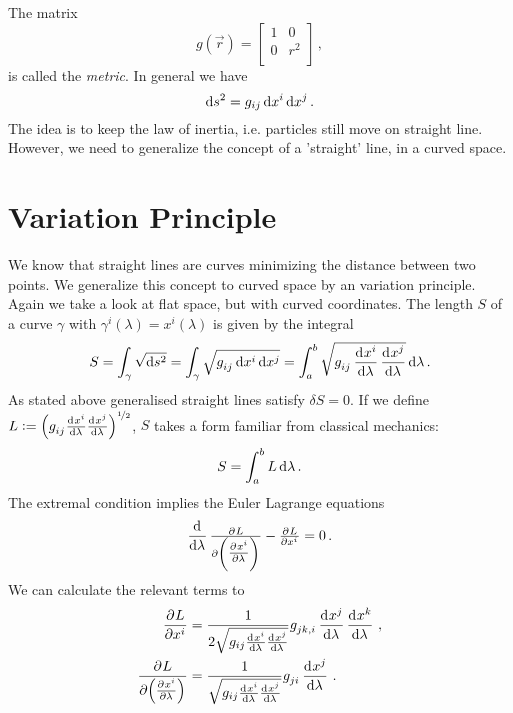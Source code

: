 The matrix
\begin{equation}
    g(\vec{r})=
    \begin{bmatrix}
        1& 0\\
        0& r^2\\
    \end{bmatrix}\, ,
\end{equation}
is called the \emph{metric}.
In general we have
\begin{equation}
    \dif s^2 = g_{ij}\dif x^i\dif x^j\, .
\end{equation}
The idea is to keep the law of inertia, i.e. particles still move on straight
line. However, we need to generalize the concept of a 'straight' line, in a
curved space.
\section{Variation Principle}
\label{sec:varprinc}
We know that straight lines are curves minimizing the distance between two
points. We generalize this concept to curved space by an variation principle.
Again we take a look at flat space, but with curved coordinates.
The length $S$ of a curve $\gamma$ with $\gamma^i(\lambda) = x^i(\lambda)$ is
given by the integral
\begin{equation}
    S=\int_{\gamma}\sqrt{\dif s^2} =
    \int_{\gamma}\sqrt{\tensor{g}{_i_j}\dif \tensor{x}{^i}\dif
    \tensor{x}{^j}}=\int_{a}^{b}\sqrt{\tensor{g}{_i_j}\dod{\tensor{x}{^i}}{\lambda}
    \dod{\tensor{x}{^j}}{\lambda}}\dif \lambda\, .
\end{equation}
As stated above generalised straight lines satisfy $\delta S = 0$. If we define
$L:=\left(\tensor{g}{_i_j}\od{\tensor{x}{^i}}{\lambda}
\od{\tensor{x}{^j}}{\lambda}\right)^{\nicefrac{1}{2}}$, $S$ takes a form
familiar from classical mechanics:
\begin{equation}
    S=\int_a^b L\dif \lambda\, .
\end{equation}
The extremal condition implies the Euler Lagrange equations
\begin{equation}
    \dod{}{\lambda}\pd{L}{\left(\pd{\tensor{x}{^i}}{\lambda}\right)}
    -\pd{L}{\tensor{x}{^i}}
    =0\, .		\end{equation}
We can calculate the relevant terms to 
\begin{align}
\dpd{L}{\tensor{x}{^i}}&=\frac{1}{2\sqrt{g_{ij}\od{x^i}{\lambda}
\od{x^j}{\lambda}}}\tensor{g}{_j_k_{,i}}\dod{x^j}{\lambda}
\dod{x^k}{\lambda}\,,\\
\dpd{L}{\left(\pd{\tensor{x}{^i}}{\lambda}\right)}
&=\frac{1}{\sqrt{g_{ij}\od{x^i}{\lambda}
\od{x^j}{\lambda}}}\tensor{g}{_j_i}\dod{x^j}{\lambda}\, .
\end{align}
